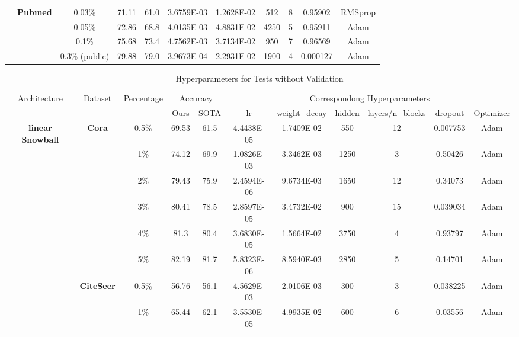 \documentclass{article}
\begin{document}
\begin{table}[htbp]
\begin{tabular}{ccccc|cccccc}
          & \multirow{4}[1]{*}{\textbf{Pubmed}} & 0.03\% & 71.11 & 61.0  & 3.6759E-03 & 1.2628E-02 & 512   & 8     & 0.95902 & RMSprop \\
          &       & 0.05\% & 72.86 & 68.8  & 4.0135E-03 & 4.8831E-02 & 4250  & 5     & 0.95911 & Adam \\
          &       & 0.1\% & 75.68 & 73.4  & 4.7562E-03 & 3.7134E-02 & 950   & 7     & 0.96569 & Adam \\
          &       & 0.3\% (public) & 79.88 & 79.0  & 3.9673E-04 & 2.2931E-02 & 1900  & 4     & 0.000127 & Adam \\
    \bottomrule
    \bottomrule
    \end{tabular}\label{tab:hyperparameters_with_validation}\end{table} 
\begin{table}[htbp]
\setlength{\tabcolsep}{1.5pt}
  \centering
  \caption{Hyperparameters for Tests without Validation}
  \scriptsize
    \begin{tabular}{ccccc|cccccc}
    \toprule
    \toprule
    \multirow{2}[2]{*}{Architecture} & \multirow{2}[2]{*}{Dataset} & \multirow{2}[2]{*}{Percentage} & \multicolumn{2}{c|}{Accuracy} & \multicolumn{6}{c}{Correspondong Hyperparameters} \\
          &       &       & Ours  & SOTA  & lr    & weight\_decay & hidden & layers/n\_blocks & dropout & Optimizer \\
    \midrule
    \multirow{16}[2]{*}{\textbf{linear Snowball}} & \multirow{6}[1]{*}{\textbf{Cora}} & 0.5\% & 69.53 & 61.5  & 4.4438E-05 & 1.7409E-02 & 550   & 12    & 0.007753 & Adam \\
          &       & 1\%   & 74.12 & 69.9  & 1.0826E-03 & 3.3462E-03 & 1250  & 3     & 0.50426 & Adam \\
          &       & 2\%   & 79.43 & 75.9  & 2.4594E-06 & 9.6734E-03 & 1650  & 12    & 0.34073 & Adam \\
          &       & 3\%   & 80.41 & 78.5  & 2.8597E-05 & 3.4732E-02 & 900   & 15    & 0.039034 & Adam \\
          &       & 4\%   & 81.3  & 80.4  & 3.6830E-05 & 1.5664E-02 & 3750  & 4     & 0.93797 & Adam \\
          &       & 5\%   & 82.19 & 81.7  & 5.8323E-06 & 8.5940E-03 & 2850  & 5     & 0.14701 & Adam \\
          & \multirow{6}[0]{*}{\textbf{CiteSeer}} & 0.5\% & 56.76 & 56.1  & 4.5629E-03 & 2.0106E-03 & 300   & 3     & 0.038225 & Adam \\
          &       & 1\%   & 65.44 & 62.1  & 3.5530E-05 & 4.9935E-02 & 600   & 6     & 0.03556 & Adam \\

\end{tabular}
\end{table}
\end{document}

